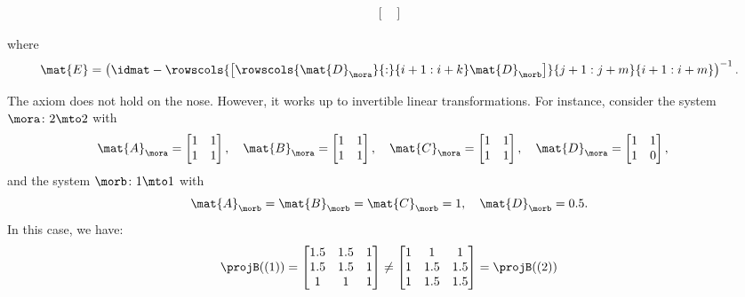\begin{example}
\begin{widepar}
\begin{equation*}
\begin{aligned}
\begin{bmatrix}
                               \end{bmatrix}
            \end{aligned}
        \end{equation*}
    \end{widepar}
    where
    \begin{equation*}
        \mat{E}=\left(\idmat - \rowscols{\begin{bmatrix}
                \rowscols{\mat{D}_\mora}{:}{i+1:i+k}\mat{D}_\morb
            \end{bmatrix}}{j+1:j+m}{i+1:i+m}\right)^{-1}.
    \end{equation*}

    The axiom does not hold on the nose.
    However, it works up to invertible linear transformations.
    For instance, consider the system $\mora \colon 2\mto 2$ with
    \begin{equation*}
        \mat{A}_\mora = \begin{bmatrix} 1&1\\ 1&1\end{bmatrix},\quad
        \mat{B}_\mora = \begin{bmatrix} 1&1\\ 1&1\end{bmatrix},\quad
        \mat{C}_\mora = \begin{bmatrix} 1&1\\ 1&1\end{bmatrix},\quad
        \mat{D}_\mora = \begin{bmatrix} 1&1\\ 1&0\end{bmatrix},\quad
    \end{equation*}
    and the system $\morb\colon 1\mto 1$ with
    \begin{equation*}
        \mat{A}_\morb=\mat{B}_\morb=\mat{C}_\morb=1,\quad \mat{D}_\morb=0.5.
    \end{equation*}
    In this case, we have:
    \begin{equation*}
        \projB((1))=\begin{bmatrix}1.5&1.5&1\\ 1.5&1.5&1\\ 1&1&1 \end{bmatrix}\neq
        \begin{bmatrix}1&1&1\\ 1&1.5&1.5\\ 1&1.5&1.5 \end{bmatrix}=\projB((2))

\end{equation*}
\end{example}
